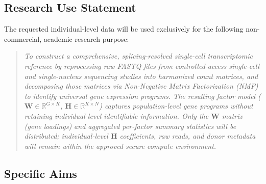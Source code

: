 \documentclass[11pt,letterpaper]{article}
\begin{document}
\subsection{Research Use Statement}

The requested individual-level data will be used exclusively for the
following non-commercial, academic research purpose:

\begin{quote}
\textit{To construct a comprehensive, splicing-resolved single-cell
transcriptomic reference by reprocessing raw FASTQ files from
controlled-access single-cell and single-nucleus sequencing studies
into harmonized count matrices, and decomposing those matrices via
Non-Negative Matrix Factorization (NMF) to identify universal gene
expression programs. The resulting factor model
($\mathbf{W} \in \mathbb{R}^{G \times K}$,
 $\mathbf{H} \in \mathbb{R}^{K \times N}$)
captures population-level gene programs without retaining
individual-level identifiable information. Only the $\mathbf{W}$ matrix
(gene loadings) and aggregated per-factor summary statistics will be
distributed; individual-level $\mathbf{H}$ coefficients, raw reads,
and donor metadata will remain within the approved secure compute
environment.}
\end{quote}

\subsection{Specific Aims}
\end{document}
